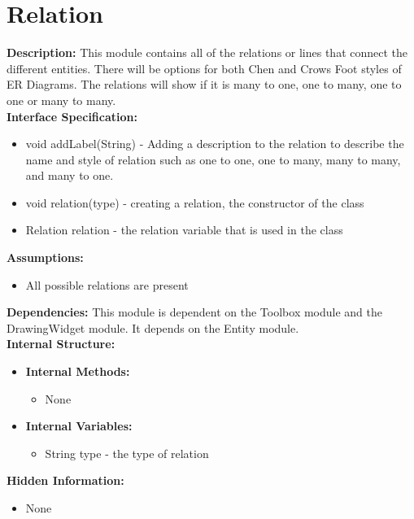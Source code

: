 \chapter{Relation}
\textbf{Description:} This module contains all of the relations or lines that connect the different entities.  There will be options for both Chen and Crows Foot styles of ER Diagrams.  The relations will show if it is many to one, one to many, one to one or many to many. \\
\textbf{Interface Specification:}
\begin{itemize}
\item{void addLabel(String) - Adding a description to the relation to describe the name and style of relation such as one to one, one to many, many to many, and many to one.}
\item{void relation(type) - creating a relation, the constructor of the class}
\item{Relation relation - the relation variable that is used in the class}
\end{itemize}
\textbf{Assumptions:}
\begin{itemize}
\item{All possible relations are present} 
\end{itemize}
\textbf{Dependencies:} This module is dependent on the Toolbox module and the DrawingWidget module.  It depends on the Entity module. \\
\textbf{Internal Structure:}
\begin{itemize}
        	\item{\textbf{Internal Methods:} 
        	\begin{itemize}
        	\item{None}
        	\end{itemize}}
        	\item{\textbf{Internal Variables:} 
        	\begin{itemize}
        	\item{String type - the type of relation}
        	\end{itemize}}
\end{itemize}
\textbf{Hidden Information:}
\begin{itemize}
\item{None} 
\end{itemize}

